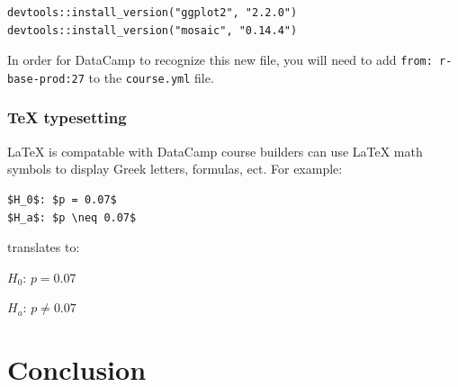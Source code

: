 \documentclass[12pt]{article}\usepackage[]{graphicx}\usepackage[]{color}
\begin{document}
\begin{verbatim}
devtools::install_version("ggplot2", "2.2.0")
devtools::install_version("mosaic", "0.14.4")
\end{verbatim}
In order for DataCamp to recognize this new file, you will need to add \texttt{from: r-base-prod:27} to the \texttt{course.yml} file.

\subsubsection{TeX typesetting}
LaTeX is compatable with DataCamp course builders can use LaTeX math symbols to display Greek letters, formulas, ect. For example:
\begin{verbatim}
$H_0$: $p = 0.07$
$H_a$: $p \neq 0.07$
\end{verbatim}

translates to:

$H_0$: $p = 0.07$

$H_a$: $p \neq 0.07$

\section{Conclusion}



\end{document}
